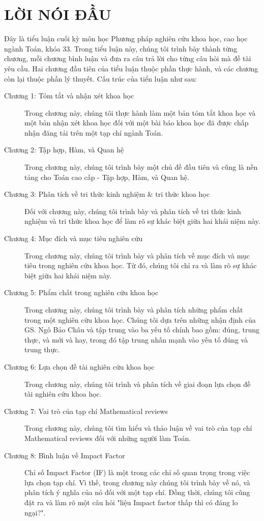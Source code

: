 \chapter*{LỜI NÓI ĐẦU}

Đây là tiểu luận cuối kỳ môn học Phương pháp nghiên cứu khoa học, cao học ngành Toán, khóa 33. Trong tiểu luận này, chúng tôi trình bày thành từng chương, mỗi chương bình luận và đưa ra câu trả lời cho từng câu hỏi mà đề tài yêu cầu. Hai chương đầu tiên của tiểu luận thuộc phần thực hành, và các chương còn lại thuộc phần lý thuyết. Cấu trúc của tiển luận như sau: 
\begin{description}
\item [Chương 1: Tóm tắt và nhận xét khoa học] Trong chương này, chúng tôi thực hành làm một bản tóm tắt khoa học và một bản nhận xét khoa học đối với một bài báo khoa học đã được chấp nhận đăng tải trên một tạp chí ngành Toán. 
\item [Chương 2: Tập hợp, Hàm, và Quan hệ] Trong chương này, chúng tôi trình bày một chủ đề đầu tiên và cũng là nền tảng cho Toán cao cấp - Tập hợp, Hàm, và Quan hệ.  
\item [Chương 3: Phân tích về tri thức kinh nghiệm \& tri thức khoa học] Đối với chương này, chúng tôi trình bày và phân tích về tri thức kinh nghiệm và tri thức khoa học để làm rõ sự khác biệt giữa hai khái niệm này. 
\item [Chương 4: Mục đích và mục tiêu nghiên cứu] Trong chương này, chúng tôi trình bày và phân tích về mục đích và mục tiêu trong nghiên cứu khoa học. Từ đó, chúng tôi chỉ ra và làm rõ sự khác biệt giữa hai khái niệm này.
\item [Chương 5: Phẩm chất trong nghiên cứu khoa học] Trong chương này, chúng tôi trình bày và phân tích những phẩm chất trong một nghiên cứu khoa học. Chúng tôi dựa trên những nhận định của GS. Ngô Bảo Châu và tập trung vào ba yếu tố chính bao gồm: đúng, trung thực, và mới và hay, trong đó tập trung nhấn mạnh vào yếu tố đúng và trung thực.
\item [Chương 6: Lựa chọn đề tài nghiên cứu khoa học] Trong chương này, chúng tôi trình và phân tích về giai đoạn lựa chọn đề tài nghiên cứu khoa học.
\item [Chương 7: Vai trò của tạp chí Mathematical reviews] Trong chương này, chúng tôi tìm hiểu và thảo luận về vai trò của tạp chí Mathematical reviews đối với những người làm Toán.
\item [Chương 8: Bình luận về Impact Factor] Chỉ số Impact Factor (IF) là một trong các chỉ số quan trọng trong việc lựa chọn tạp chí. Vì thế, trong chương này chúng tôi trình bày về nó, và phân tích ý nghĩa của nó đối với một tạp chí. Đồng thời, chúng tôi cũng đặt ra và làm rõ một câu hỏi "liệu Impact factor thấp thì có đáng lo ngại?".

\end{description}
